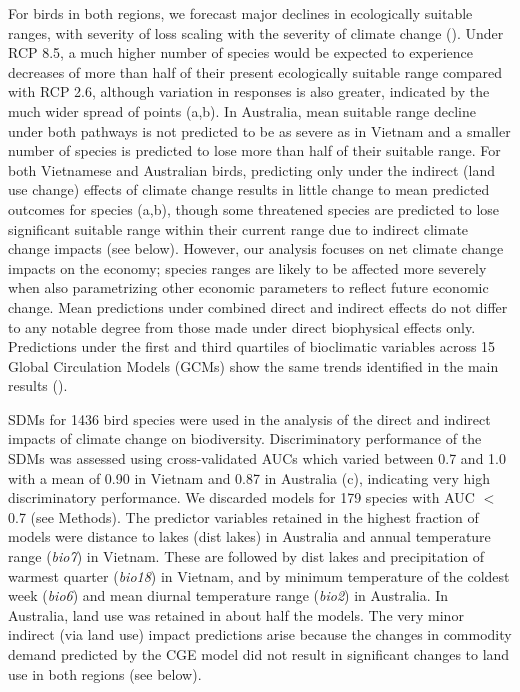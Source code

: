 \documentclass[titlesmallcaps,copyrightpage]{uomthesis}\usepackage[]{graphicx}\usepackage[]{color}
\begin{document}
For birds in both regions, we forecast major declines in ecologically suitable ranges, with severity of loss scaling with the severity of climate change (). Under RCP 8.5, a much higher number of species would be expected to experience decreases of more than half of their present ecologically suitable range compared with RCP 2.6, although variation in responses is also greater, indicated by the much wider spread of points (a,b). In Australia, mean suitable range decline under both pathways is not predicted to be as severe as in Vietnam and a smaller number of species is predicted to lose more than half of their suitable range. For both Vietnamese and Australian birds, predicting only under the indirect (land use change) effects of climate change results in little change to mean predicted outcomes for species (a,b), though some threatened species are predicted to lose significant suitable range within their current range due to indirect climate change impacts (see below). However, our analysis focuses on net climate change impacts on the economy; species ranges are likely to be affected more severely when also parametrizing other economic parameters to reflect future economic change. Mean predictions under combined direct and indirect effects do not differ to any notable degree from those made under direct biophysical effects only. Predictions under the first and third quartiles of bioclimatic variables across 15 Global Circulation Models (GCMs) show the same trends identified in the main results ().

SDMs for 1436 bird species were used in the analysis of the direct and indirect impacts of climate change on biodiversity. Discriminatory performance of the SDMs was assessed using cross-validated AUCs which varied between 0.7 and 1.0 with a mean of 0.90 in Vietnam and 0.87 in Australia (c), indicating very high discriminatory performance. We discarded models for 179 species with AUC $<$ 0.7 (see Methods). The predictor variables retained in the highest fraction of models were distance to lakes (dist lakes) in Australia and annual temperature range (\textit{bio7}) in Vietnam. These are followed by dist lakes and precipitation of warmest quarter (\textit{bio18}) in Vietnam, and by minimum temperature of the coldest week (\textit{bio6}) and mean diurnal temperature range (\textit{bio2}) in Australia. In Australia, land use was retained in about half the models. The very minor indirect (via land use) impact predictions arise because the changes in commodity demand predicted by the CGE model did not result in significant changes to land use in both regions (see below).
\end{document}
